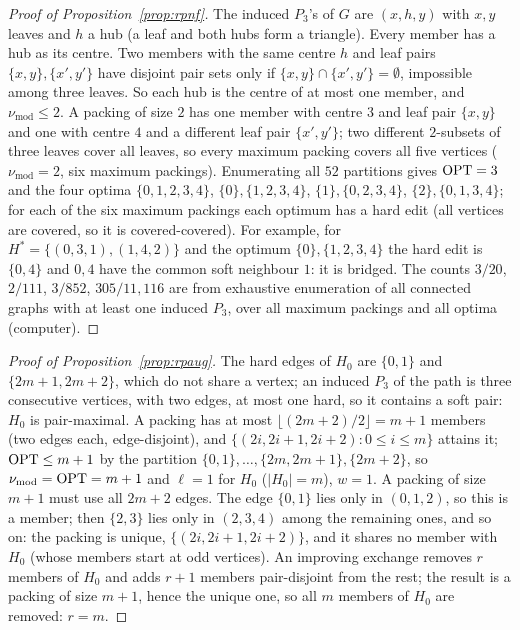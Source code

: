 \begin{proof}[Proof of Proposition~\ref{prop:rpnf}]
The induced $P_3$'s of $G$ are $(x,h,y)$ with $x,y$ leaves and $h$ a hub (a leaf and both hubs form a triangle). Every member has a hub as its centre. Two members with the same centre $h$ and leaf pairs $\{x,y\},\{x',y'\}$ have disjoint pair sets only if $\{x,y\}\cap\{x',y'\}=\emptyset$, impossible among three leaves. So each hub is the centre of at most one member, and $\nu_{\mathrm{mod}}\le2$. A packing of size $2$ has one member with centre $3$ and leaf pair $\{x,y\}$ and one with centre $4$ and a different leaf pair $\{x',y'\}$; two different $2$-subsets of three leaves cover all leaves, so every maximum packing covers all five vertices ($\nu_{\mathrm{mod}}=2$, six maximum packings). Enumerating all $52$ partitions gives $\mathrm{OPT}=3$ and the four optima $\{0,1,2,3,4\}$, $\{0\},\{1,2,3,4\}$, $\{1\},\{0,2,3,4\}$, $\{2\},\{0,1,3,4\}$; for each of the six maximum packings each optimum has a hard edit (all vertices are covered, so it is covered-covered). For example, for $H^*=\{(0,3,1),(1,4,2)\}$ and the optimum $\{0\},\{1,2,3,4\}$ the hard edit is $\{0,4\}$ and $0,4$ have the common soft neighbour $1$: it is bridged. The counts $3/20$, $2/111$, $3/852$, $305/11{,}116$ are from exhaustive enumeration of all connected graphs with at least one induced $P_3$, over all maximum packings and all optima (computer).
\end{proof}

\begin{proof}[Proof of Proposition~\ref{prop:rpaug}]
The hard edges of $H_0$ are $\{0,1\}$ and $\{2m+1,2m+2\}$, which do not share a vertex; an induced $P_3$ of the path is three consecutive vertices, with two edges, at most one hard, so it contains a soft pair: $H_0$ is pair-maximal. A packing has at most $\lfloor(2m+2)/2\rfloor=m+1$ members (two edges each, edge-disjoint), and $\{(2i,2i+1,2i+2):0\le i\le m\}$ attains it; $\mathrm{OPT}\le m+1$ by the partition $\{0,1\},\dots,\{2m,2m+1\},\{2m+2\}$, so $\nu_{\mathrm{mod}}=\mathrm{OPT}=m+1$ and $\ell=1$ for $H_0$ ($|H_0|=m$), $w=1$. A packing of size $m+1$ must use all $2m+2$ edges. The edge $\{0,1\}$ lies only in $(0,1,2)$, so this is a member; then $\{2,3\}$ lies only in $(2,3,4)$ among the remaining ones, and so on: the packing is unique, $\{(2i,2i+1,2i+2)\}$, and it shares no member with $H_0$ (whose members start at odd vertices). An improving exchange removes $r$ members of $H_0$ and adds $r+1$ members pair-disjoint from the rest; the result is a packing of size $m+1$, hence the unique one, so all $m$ members of $H_0$ are removed: $r=m$.
\end{proof}

